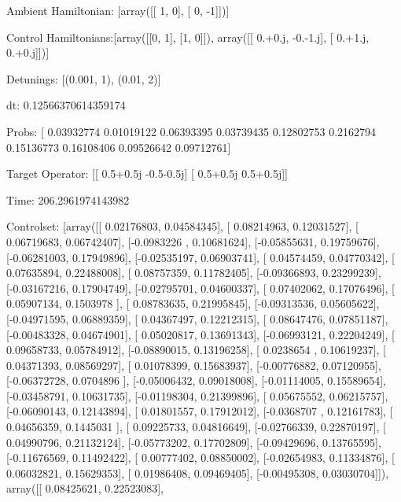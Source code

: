 \documentclass{article}
\begin{document}
    

\newpage

Ambient Hamiltonian: [array([[ 1,  0],
       [ 0, -1]])]

Control Hamiltonians:[array([[0, 1],
       [1, 0]]), array([[ 0.+0.j, -0.-1.j],
       [ 0.+1.j,  0.+0.j]])]

Detunings: [(0.001, 1), (0.01, 2)]

 dt: 0.12566370614359174

Probs: [ 0.03932774  0.01019122  0.06393395  0.03739435  0.12802753  0.2162794
  0.15136773  0.16108406  0.09526642  0.09712761]

Target Operator: [[ 0.5+0.5j -0.5-0.5j]
 [ 0.5+0.5j  0.5+0.5j]]

Time: 206.2961974143982

Controlset: [array([[ 0.02176803,  0.04584345],
       [ 0.08214963,  0.12031527],
       [ 0.06719683,  0.06742407],
       [-0.0983226 ,  0.10681624],
       [-0.05855631,  0.19759676],
       [-0.06281003,  0.17949896],
       [-0.02535197,  0.06903741],
       [ 0.04574459,  0.04770342],
       [ 0.07635894,  0.22488008],
       [ 0.08757359,  0.11782405],
       [-0.09366893,  0.23299239],
       [-0.03167216,  0.17904749],
       [-0.02795701,  0.04600337],
       [ 0.07402062,  0.17076496],
       [ 0.05907134,  0.1503978 ],
       [ 0.08783635,  0.21995845],
       [-0.09313536,  0.05605622],
       [-0.04971595,  0.06889359],
       [ 0.04367497,  0.12212315],
       [ 0.08647476,  0.07851187],
       [-0.00483328,  0.04674901],
       [ 0.05020817,  0.13691343],
       [-0.06993121,  0.22204249],
       [ 0.09658733,  0.05784912],
       [-0.08890015,  0.13196258],
       [ 0.0238654 ,  0.10619237],
       [ 0.04371393,  0.08569297],
       [ 0.01078399,  0.15683937],
       [-0.00776882,  0.07120955],
       [-0.06372728,  0.0704896 ],
       [-0.05006432,  0.09018008],
       [-0.01114005,  0.15589654],
       [-0.03458791,  0.10631735],
       [-0.01198304,  0.21399896],
       [ 0.05675552,  0.06215757],
       [-0.06090143,  0.12143894],
       [ 0.01801557,  0.17912012],
       [-0.0368707 ,  0.12161783],
       [ 0.04656359,  0.1445031 ],
       [ 0.09225733,  0.04816649],
       [-0.02766339,  0.22870197],
       [ 0.04990796,  0.21132124],
       [-0.05773202,  0.17702809],
       [-0.09429696,  0.13765595],
       [-0.11676569,  0.11492422],
       [ 0.00777402,  0.08850002],
       [-0.02654983,  0.11334876],
       [ 0.06032821,  0.15629353],
       [ 0.01986408,  0.09469405],
       [-0.00495308,  0.03030704]]), array([[ 0.08425621,  0.22523083],
\end{document}
